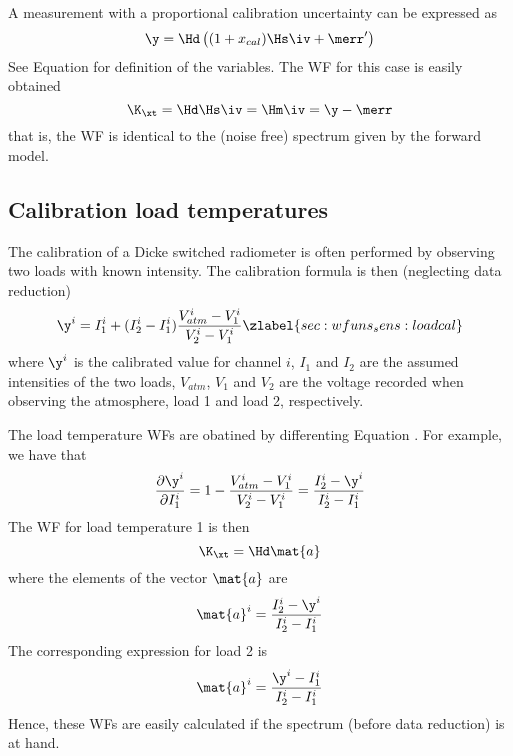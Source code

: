  A measurement with a proportional calibration uncertainty
 can be expressed as
 \begin{equation}
   \y = \Hd\left( (1+x_{cal})\Hs\iv+\merr' \right)
 \end{equation}
 See Equation  for definition of the variables.
 The WF for this case is easily obtained
 \begin{equation}
   \K_{\xt} = \Hd\Hs\iv = \Hm\iv = \y - \merr
 \end{equation}
 that is, the WF is identical to the (noise free) spectrum given by the forward
 model. 

 
 \subsection{Calibration load temperatures} 
 The calibration of a Dicke switched radiometer is often performed by
 observing two loads with known intensity. The calibration formula is
 then (neglecting data reduction)
 \begin{equation}
   \y^i =  I_1^i + (I_2^i-I_1^i)\frac{V_{atm}^i-V_1^i}{V_2^i-V_1^i} 
  \zlabel{sec:wfuns_sens:loadcal}
 \end{equation}
 where $\y^i$ is the calibrated value for channel $i$, $I_1$ and $I_2$
 are the assumed intensities of the two loads, $V_{atm}$, $V_1$ and
 $V_2$ are the voltage recorded when observing the atmosphere, load 1
 and load 2, respectively.
 
 The load temperature WFs are obatined by differenting Equation
 . For example, we have that \citep{eriksson:97a}
 \begin{equation}
   \frac{\partial \y^i}{\partial I_1^i} = 1 - 
     \frac{V_{atm}^i-V_1^i}{V_2^i-V_1^i} = \frac{I_2^i-\y^i}{I_2^i-I_1^i} 
 \end{equation}
 The WF for load temperature 1 is then
 \begin{equation}
   \K_{\xt} = \Hd \mat{a}
 \end{equation}
 where the elements of the vector $\mat{a}$ are
 \begin{equation}
   \mat{a}^i = \frac{I_2^i-\y^i}{I_2^i-I_1^i}
 \end{equation}
 The corresponding expression for load 2 is
 \begin{equation}
   \mat{a}^i = \frac{\y^i-I_1^i}{I_2^i-I_1^i}
 \end{equation}
 Hence, these WFs are easily calculated if the spectrum (before data
 reduction) is at hand.



